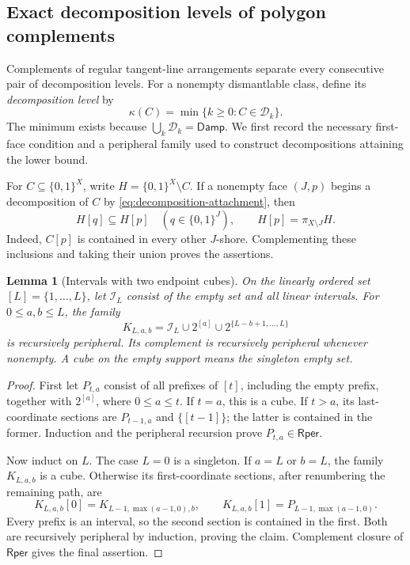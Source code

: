 \documentclass[11pt]{article}
\newtheorem{lemma}[proposition]{Lemma}
\theoremstyle{definition}
\newcommand{\bits}{\{0,1\}}
\newcommand{\Damp}{\mathsf{Damp}}
\newcommand{\Rper}{\mathsf{Rper}}
\begin{document}
\subsection{Exact decomposition levels of polygon complements}
\label{sec:polygon-decomposition}

Complements of regular tangent-line arrangements separate every consecutive
pair of decomposition levels. For a nonempty dismantlable class, define
its \emph{decomposition level} by
\[
 \kappa(C)=\min\{k\ge0:C\in\mathcal D_k\}.
\]
The minimum exists because $\bigcup_k\mathcal D_k=\Damp$.
We first record the necessary first-face condition and a peripheral family
used to construct decompositions attaining the lower bound.

For $C\subseteq\bits^X$, write $H=\bits^X\setminus C$.
If a nonempty face $(J,p)$ begins a decomposition of $C$ by
\eqref{eq:decomposition-attachment}, then
\begin{equation}\label{eq:dominant-complement-shore}
 H[q]\subseteq H[p]\quad(q\in\bits^J),\qquad
 H[p]=\pi_{X\setminus J}H.
\end{equation}
Indeed, $C[p]$ is contained in every other $J$-shore. Complementing
these inclusions and taking their union proves the assertions.

\begin{lemma}[Intervals with two endpoint cubes]
\label{lem:interval-endpoint-cubes}
On the linearly ordered set $[L]=\{1,\ldots,L\}$, let $\mathcal I_L$
consist of the empty set and all linear intervals. For $0\le a,b\le L$,
the family
\[
 K_{L,a,b}=\mathcal I_L\cup2^{[a]}
              \cup2^{\{L-b+1,\ldots,L\}}
\]
is recursively peripheral. Its complement is recursively peripheral
whenever nonempty. A cube on the empty support means the singleton
empty set.
\end{lemma}
\begin{proof}
First let $P_{t,a}$ consist of all prefixes of $[t]$, including the
empty prefix, together with $2^{[a]}$, where $0\le a\le t$.
If $t=a$, this is a cube. If $t>a$, its last-coordinate sections are
$P_{t-1,a}$ and $\{[t-1]\}$; the latter is contained in the former.
Induction and the peripheral recursion prove $P_{t,a}\in\Rper$.

Now induct on $L$. The case $L=0$ is a singleton. If $a=L$ or
$b=L$, the family $K_{L,a,b}$ is a cube. Otherwise its
first-coordinate sections, after renumbering the remaining path, are
\[
 K_{L,a,b}[0]=K_{L-1,\max(a-1,0),b},\qquad
 K_{L,a,b}[1]=P_{L-1,\max(a-1,0)}.
\]
Every prefix is an interval, so the second section is contained in the
first. Both are recursively peripheral by induction, proving the claim.
Complement closure of $\Rper$ gives the final assertion.
\end{proof}
\end{document}
